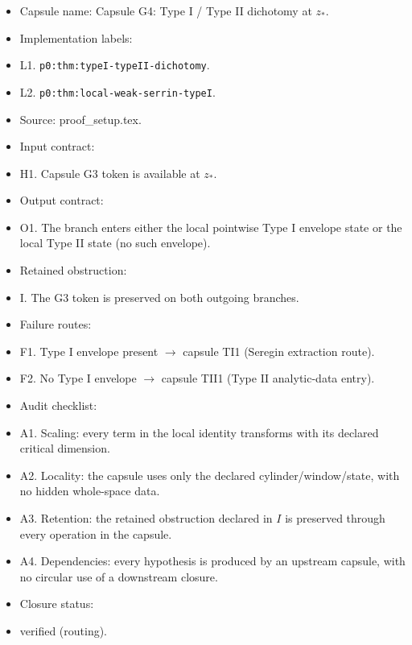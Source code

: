 \documentclass[11pt]{amsart}
\begin{document}
\begin{itemize}
  \item Capsule name: Capsule G4: Type I / Type II dichotomy at $z_*$.
  \item Implementation labels:
  \item L1. \texttt{p0:thm:typeI-typeII-dichotomy}.
  \item L2. \texttt{p0:thm:local-weak-serrin-typeI}.
  \item Source: proof\_setup.tex.
  \item Input contract:
  \item H1. Capsule G3 token is available at $z_*$.
  \item Output contract:
  \item O1. The branch enters either the local pointwise Type I envelope state or the local Type II state (no such envelope).
  \item Retained obstruction:
  \item I. The G3 token is preserved on both outgoing branches.
  \item Failure routes:
  \item F1. Type I envelope present $\to$ capsule TI1 (Seregin extraction route).
  \item F2. No Type I envelope $\to$ capsule TII1 (Type II analytic-data entry).
  \item Audit checklist:
  \item A1. Scaling: every term in the local identity transforms with its declared critical dimension.
  \item A2. Locality: the capsule uses only the declared cylinder/window/state, with no hidden whole-space data.
  \item A3. Retention: the retained obstruction declared in $I$ is preserved through every operation in the capsule.
  \item A4. Dependencies: every hypothesis is produced by an upstream capsule, with no circular use of a downstream closure.
  \item Closure status:
  \item verified (routing).
\end{itemize}
\end{document}
